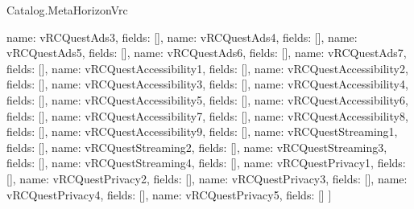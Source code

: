 \begin{lexlean}{Catalog.MetaHorizonVrc}
\begin{semanticmodule}
{    {name: vRCQuestAds3, fields: []},
    {name: vRCQuestAds4, fields: []},
    {name: vRCQuestAds5, fields: []},
    {name: vRCQuestAds6, fields: []},
    {name: vRCQuestAds7, fields: []},
    {name: vRCQuestAccessibility1, fields: []},
    {name: vRCQuestAccessibility2, fields: []},
    {name: vRCQuestAccessibility3, fields: []},
    {name: vRCQuestAccessibility4, fields: []},
    {name: vRCQuestAccessibility5, fields: []},
    {name: vRCQuestAccessibility6, fields: []},
    {name: vRCQuestAccessibility7, fields: []},
    {name: vRCQuestAccessibility8, fields: []},
    {name: vRCQuestAccessibility9, fields: []},
    {name: vRCQuestStreaming1, fields: []},
    {name: vRCQuestStreaming2, fields: []},
    {name: vRCQuestStreaming3, fields: []},
    {name: vRCQuestStreaming4, fields: []},
    {name: vRCQuestPrivacy1, fields: []},
    {name: vRCQuestPrivacy2, fields: []},
    {name: vRCQuestPrivacy3, fields: []},
    {name: vRCQuestPrivacy4, fields: []},
    {name: vRCQuestPrivacy5, fields: []}
  ]
}
\end{semanticmodule}
\end{lexlean}
